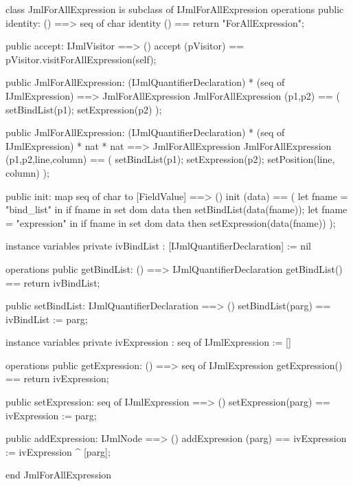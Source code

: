 \begin{vdm_al}
class JmlForAllExpression is subclass of IJmlForAllExpression
operations
  public identity: () ==> seq of char
  identity () == return "ForAllExpression";

  public accept: IJmlVisitor ==> ()
  accept (pVisitor) == pVisitor.visitForAllExpression(self);

  public JmlForAllExpression:
    (IJmlQuantifierDeclaration) *
    (seq of IJmlExpression) ==> JmlForAllExpression
  JmlForAllExpression (p1,p2) == 
    ( setBindList(p1);
      setExpression(p2) );

  public JmlForAllExpression:
    (IJmlQuantifierDeclaration) *
    (seq of IJmlExpression) *
    nat *
    nat ==> JmlForAllExpression
  JmlForAllExpression (p1,p2,line,column) == 
    ( setBindList(p1);
      setExpression(p2);
      setPosition(line, column) );

  public init: map seq of char to [FieldValue] ==> ()
  init (data) ==
    ( let fname = "bind_list" in
        if fname in set dom data
        then setBindList(data(fname));
      let fname = "expression" in
        if fname in set dom data
        then setExpression(data(fname)) );

instance variables
  private ivBindList : [IJmlQuantifierDeclaration] := nil

operations
  public getBindList: () ==> IJmlQuantifierDeclaration
  getBindList() == return ivBindList;

  public setBindList: IJmlQuantifierDeclaration ==> ()
  setBindList(parg) == ivBindList := parg;

instance variables
  private ivExpression : seq of IJmlExpression := []

operations
  public getExpression: () ==> seq of IJmlExpression
  getExpression() == return ivExpression;

  public setExpression: seq of IJmlExpression ==> ()
  setExpression(parg) == ivExpression := parg;

  public addExpression: IJmlNode ==> ()
  addExpression (parg) == ivExpression := ivExpression ^ [parg];

end JmlForAllExpression
\end{vdm_al}

